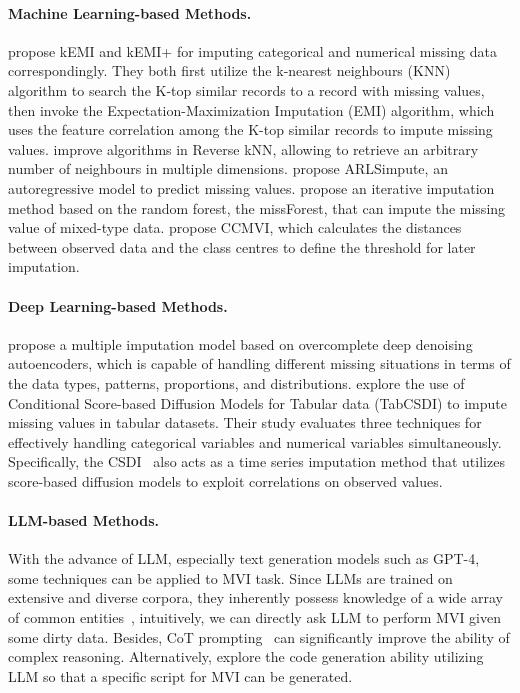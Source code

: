 \documentclass[sigconf]{acmart}
\begin{document}
\paragraph{Machine Learning-based Methods.}
\citet{razavi2020similarity} propose kEMI and kEMI+ for imputing categorical and numerical missing data correspondingly. They both first utilize the k-nearest neighbours (KNN) algorithm to search the K-top similar records to a record with missing values, then invoke the Expectation-Maximization Imputation (EMI) algorithm, which uses the feature correlation among the K-top similar records to impute missing values. \citet{tao2004reverse} improve algorithms in Reverse kNN, allowing to retrieve an arbitrary number of neighbours in multiple dimensions. \citet{5972466} propose ARLSimpute, an autoregressive model to predict missing values. \citet{stekhoven2012missforest} propose an iterative imputation method based on the random forest, the missForest, that can impute the missing value of mixed-type data. \citet{tsai2018class} propose CCMVI, which calculates the distances between observed data and the class centres to define the threshold for later imputation.

\paragraph{Deep Learning-based Methods.}
\citet{gondara2018mida} propose a multiple imputation model based on overcomplete deep denoising autoencoders, which is capable of handling different missing situations in terms of the data types, patterns, proportions, and distributions.
\citet{zheng2022diffusion} explore the use of Conditional Score-based Diffusion Models for Tabular data (TabCSDI) to impute missing values in tabular datasets. Their study evaluates three techniques for effectively handling categorical variables and numerical variables simultaneously. Specifically, the CSDI~\cite{tashiro2021csdi} also acts as a time series imputation method that utilizes score-based diffusion models to exploit correlations on observed values. 


\paragraph{LLM-based Methods.}
With the advance of LLM, especially text generation models such as GPT-4, some techniques can be applied to MVI task. Since LLMs are trained on extensive and diverse corpora, they inherently possess knowledge of a wide array of common entities~\cite{razniewski2021language, narayan2022can}, intuitively, we can directly ask LLM to perform MVI given some dirty data. Besides, CoT prompting~\cite{wei2023chainofthought} can significantly improve the ability of complex reasoning. Alternatively, \citet{poldrack2023ai} explore the code generation ability utilizing LLM so that a specific script for MVI can be generated.
\end{document}
